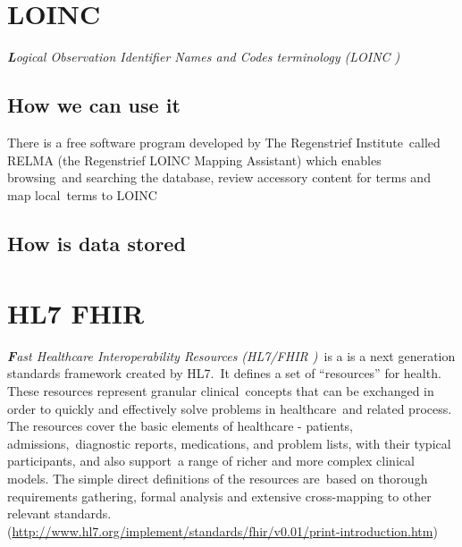 \documentclass[DIV=calc, paper=a4, fontsize=12pt, onecolumn]{scrartcl}	 %
\newcommand{\initial}[1]{ %
\lettrine[lines=3,lhang=0.3,nindent=0em,slope=0em]{
\color{DarkBlue}
{\textbf{\textit{#1}}}}{}}
\begin{document}
  \section[Logical Observation Identifier Names and Codes terminology\
  (LOINC\textsuperscript{\textregistered})] 
  {LOINC\textsuperscript{\textregistered}}
  \label{sec:loinc}
  
  \initial{L}\textit{ogical Observation Identifier Names and Codes terminology (LOINC )}\\



  \subsection{How we can use it}

  There is a free software program developed by The Regenstrief Institute\
  called RELMA (the Regenstrief LOINC Mapping Assistant) which enables browsing\
  and searching the database, review accessory content for terms and map local\
  terms to LOINC \citep{kroth_using_2012} 

  \subsection{How is data stored}


  \section[Fast Healthcare Interoperability Resources (HL7 FHIR\textsuperscript{\texttrademark})]
  {HL7 FHIR \textsuperscript{\texttrademark}}
    \label{sec:fhir}

  \initial{F}\textit{ast Healthcare Interoperability Resources (HL7/FHIR )}\
  is a is a next generation standards framework created by HL7.\
  It defines a set of ``resources'' for health. These resources represent granular clinical\
  concepts that can be exchanged in order to quickly and effectively solve problems in healthcare\
  and related process. The resources cover the basic elements of healthcare - patients, admissions,\
  diagnostic reports, medications, and problem lists, with their typical participants, and also support\
  a range of richer and more complex clinical models. The simple direct definitions of the resources are\
  based on thorough requirements gathering, formal analysis and extensive cross-mapping to other relevant standards.\\
  (\url{http://www.hl7.org/implement/standards/fhir/v0.01/print-introduction.htm})\\
\end{document}

